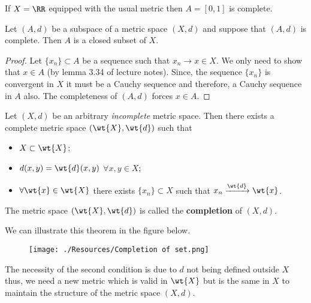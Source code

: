 \documentclass[12pt, a4paper]{article}
\begin{document}
\begin{example}
    If \(X = \RR\) equipped with the usual metric then \(A=[0,1]\) is complete.
\end{example}

\begin{mdprop}
    Let \((A,d)\) be a subspace of a metric space \((X,d)\) and suppose that \((A,d)\) is complete. Then \(A\) is a closed subset of \(X\).
\end{mdprop}

\begin{proof}
    Let \(\{x_n\} \subset A\) be a sequence such that \(x_n \to x \in X\). We only need to show that \(x \in A\) (by lemma 3.34 of lecture notes). Since, the sequence \(\{x_n\}\) is convergent in \(X\) it must be a Cauchy sequence and therefore, a Cauchy sequence in \(A\) also. The completeness of \((A,d)\) forces \(x \in A\).
\end{proof}

\begin{mdthm}
    Let \((X,d)\) be an arbitrary \textit{incomplete} metric space. Then there exists a complete metric space \((\wt{X},\wt{d})\) such that 
    \begin{itemize}
        \item \(X \subset \wt{X}\);
        \item \(d(x,y)=\wt{d}(x,y)\) \(\forall x,y \in X\);
        \item \(\forall \wt{x} \in \wt{X}\) there exists \(\{x_n\} \subset X\) such that \(x_n \xrightarrow{\wt{d}} \wt{x}\).
    \end{itemize}
    The metric space \((\wt{X},\wt{d})\) is called the \textbf{completion} of \((X,d)\).
\end{mdthm}

\begin{mdnote}
    We can illustrate this theorem in the figure below.
    \begin{figure}[H]
        \begin{center}
            \texttt{[image: ./Resources/Completion of set.png]}
        \end{center}
   \end{figure}
\end{mdnote}

\begin{mdremark}
    The necessity of the second condition is due to \(d\) not being defined outside \(X\) thus, we need a new metric which is valid in \(\wt{X}\) but is the same in \(X\) to maintain the structure of the metric space \((X,d)\).
\end{mdremark}
\end{document}
